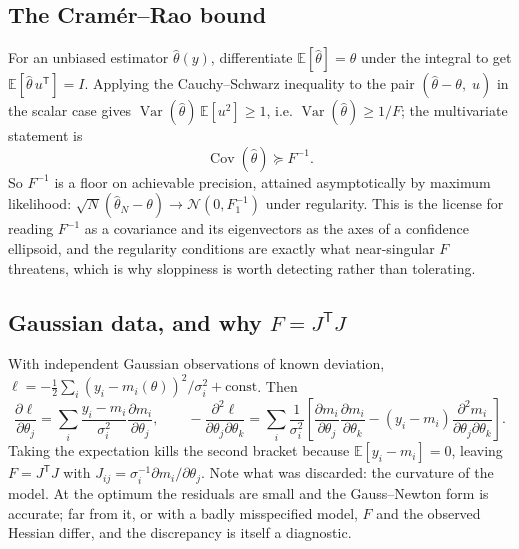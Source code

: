 \documentclass[10pt]{article}
\begin{document}
\subsection{The Cram\'er--Rao bound}

For an unbiased estimator $\hat\theta(y)$, differentiate
$\mathbb{E}[\hat\theta] = \theta$ under the integral to get
$\mathbb{E}[\hat\theta\,u^{\mathsf T}] = I$. Applying the Cauchy--Schwarz inequality to the
pair $(\hat\theta - \theta,\; u)$ in the scalar case gives
$\operatorname{Var}(\hat\theta)\,\mathbb{E}[u^2] \ge 1$, i.e.
$\operatorname{Var}(\hat\theta)\ge 1/F$; the multivariate statement is
%
\begin{equation}
\operatorname{Cov}(\hat\theta) \succeq F^{-1} .
\end{equation}
%
So $F^{-1}$ is a floor on achievable precision, attained asymptotically by maximum
likelihood: $\sqrt{N}(\hat\theta_N - \theta) \to \mathcal{N}(0, F_1^{-1})$ under regularity.
This is the license for reading $F^{-1}$ as a covariance and its eigenvectors as the axes of
a confidence ellipsoid, and the regularity conditions are exactly what near-singular $F$
threatens, which is why sloppiness is worth detecting rather than tolerating.

\subsection{Gaussian data, and why $F = J^{\mathsf T}J$}

With independent Gaussian observations of known deviation,
$\ell = -\tfrac12\sum_i (y_i - m_i(\theta))^2/\sigma_i^2 + \text{const}$. Then
%
\begin{equation}
\frac{\partial \ell}{\partial\theta_j}
= \sum_i \frac{y_i - m_i}{\sigma_i^2}\frac{\partial m_i}{\partial\theta_j},
\qquad
-\frac{\partial^2\ell}{\partial\theta_j\partial\theta_k}
= \sum_i \frac{1}{\sigma_i^2}
  \left[\frac{\partial m_i}{\partial\theta_j}\frac{\partial m_i}{\partial\theta_k}
  - (y_i - m_i)\frac{\partial^2 m_i}{\partial\theta_j\partial\theta_k}\right].
\end{equation}
%
Taking the expectation kills the second bracket because $\mathbb{E}[y_i - m_i] = 0$, leaving
$F = J^{\mathsf T}J$ with $J_{ij} = \sigma_i^{-1}\partial m_i/\partial\theta_j$. Note what
was discarded: the curvature of the model. At the optimum the residuals are small and the
Gauss--Newton form is accurate; far from it, or with a badly misspecified model, $F$ and the
observed Hessian differ, and the discrepancy is itself a diagnostic.
\end{document}
